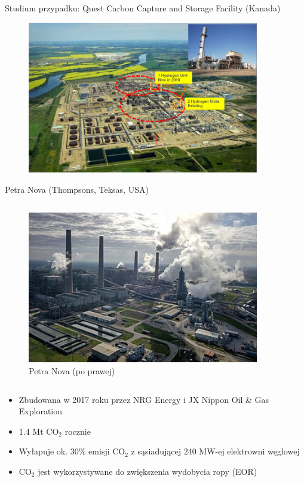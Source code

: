 \begin{frame}{Studium przypadku: Quest Carbon Capture and Storage Facility (Kanada)}
    \begin{figure}
        \centering
        \includegraphics[width=0.9\textwidth, frame]{images/quest_ccs_hydrogen_farms.png}
    \end{figure}
\end{frame}

\begin{columnframe}{Petra Nova (Thompsons, Teksas, USA)}
    \begin{column}{0.5\textwidth}
        \begin{figure}
            \centering
            \includegraphics[width=0.9\textwidth, frame]{images/petra_nova_plant.jpg}
            \caption{Petra Nova (po prawej)}
        \end{figure}
    \end{column}
    \begin{column}{0.5\textwidth}
        \begin{itemize}
            \item Zbudowana w 2017 roku przez NRG Energy i JX Nippon Oil \& Gas Exploration
            \item 1.4 Mt CO$_2$ rocznie
            \item Wyłapuje ok. 30\% emisji CO$_2$ z sąsiadującej 240 MW-ej elektrowni węglowej
            \item CO$_2$ jest wykorzystywane do zwiększenia wydobycia ropy (EOR)
        \end{itemize}
    \end{column}
\end{columnframe}

